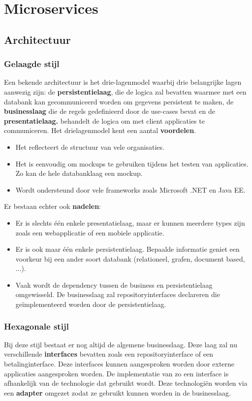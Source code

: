 \documentclass{report}
\begin{document}
	\tableofcontents
	
	\part{Microservices}
	\chapter{Architectuur}
	\section{Gelaagde stijl}
	Een bekende architectuur is het drie-lagenmodel waarbij drie belangrijke lagen aanwezig zijn: de \textbf{persistentielaag}, die de logica zal bevatten waarmee met een databank kan gecommuniceerd worden om gegevens persistent te maken, de \textbf{businesslaag} die de regels gedefinieerd  door de use-cases bevat  en de \textbf{presentatielaag.} behandelt de logica om met client applicaties te communiceren. Het drielagenmodel kent een aantal \textbf{voordelen}.
	\begin{itemize}
		\item Het reflecteert de structuur van vele organisaties.
		\item Het is eenvoudig om mockups te gebruiken tijdens het testen van applicaties. Zo kan de hele databanklaag een mockup.
		\item Wordt ondersteund door vele frameworks zoals Microsoft .NET en Java EE.
	\end{itemize}
	Er bestaan echter ook \textbf{nadelen}:
	\begin{itemize}
		\item Er is slechts één enkele presentatielaag, maar er kunnen meerdere types zijn zoals een webapplicatie of een mobiele applicatie. 
		\item Er is ook maar één enkele persistentielaag. Bepaalde informatie geniet een voorkeur bij een ander soort databank (relationeel, grafen, document based, ...).
		\item Vaak wordt de dependency tussen de business en persistentielaag omgewisseld. De businesslaag zal repositoryinterfaces declareren die geïmplementeerd worden door de persistentielaag.
	\end{itemize}
	\section{Hexagonale stijl}
	Bij deze stijl bestaat er nog altijd de algemene businesslaag. Deze laag zal nu verschillende \textbf{interfaces} bevatten zoals een repositoryinterface of een betalinginterface. Deze interfaces kunnen aangesproken worden door externe applicaties aangesproken worden. De implementatie van zo een interface is afhankelijk van de technologie dat gebruikt wordt. Deze technologiën worden via een \textbf{adapter} omgezet zodat ze gebruikt kunnen worden in de businesslaag.
	
\end{document}
